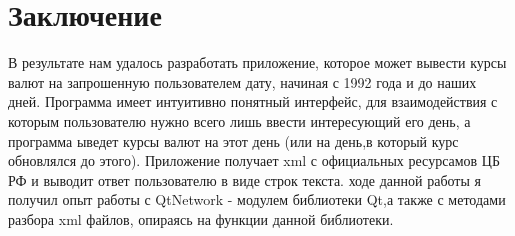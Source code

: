 \documentclass[a4paper,12pt]{article}
\begin{document}







\newpage
\section*{Заключение}
В результате нам удалось разработать приложение, которое может вывести курсы валют на запрошенную пользователем дату, начиная с 1992 года и до наших дней. Программа имеет интуитивно понятный интерфейс, для взаимодействия с которым пользователю нужно всего лишь ввести интересующий его день, а программа ыведет курсы валют на этот день (или на день,в который курс обновлялся до этого). Приложение получает xml с официальных ресурсамов ЦБ РФ и выводит ответ пользователю в виде строк текста.
 ходе данной работы я получил опыт работы с QtNetwork - модулем библиотеки Qt,а также с методами разбора xml файлов, опираясь на функции данной библиотеки.



\end{document}
